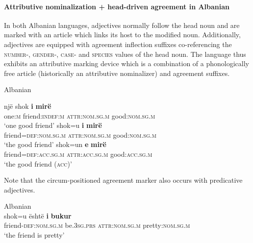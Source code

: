 \paragraph{Attributive nominalization + head-driven agreement in Albanian}
In both Albanian languages, adjectives normally follow the head noun and are marked with an article which links its host to the modified noun. Additionally, adjectives are equipped with agreement inflection suffixes co-referencing the \textsc{number}-, \textsc{gender}-, \textsc{case}- and \textsc{species} values of the head noun. The language thus exhibits an attributive marking device which is a combination of a phonologically free article (historically an attributive nominalizer) and agreement suffixes.
\begin{exe}
\label{albanian ex}
\ex \rm{Albanian \citep[examples from][166–167]{himmelmann1997}}
\begin{xlist}
\ex
\gll	nj\"e	shok 	\textbf{i}	\textbf{mir\"e}\\
	one:\textsc{m}	friend:\textsc{indef:m} 	\textsc{attr:nom.sg.m}	good:\textsc{nom.sg.m}\\
\glt	‘one good friend’
\ex	
\gll	shok=u			\textbf{i}			\textbf{mir\"e}\\
	friend=\textsc{def:nom.sg.m} 	\textsc{attr:nom.sg.m} 	good:\textsc{nom.sg.m}\\
\glt	‘the good friend’
\ex
\gll	shok=un					\textbf{e}			\textbf{mir\"e}\\
	friend=\textsc{def:acc.sg.m} 	\textsc{attr:acc.sg.m} 	good:\textsc{acc.sg.m}\\
\glt	‘the good friend (\textsc{acc})’
\end{xlist}
\end{exe}
Note that the circum-positioned agreement marker also occurs with predicative adjectives. 
\begin{exe}
\ex \rm{Albanian \citep{demiraj1998}}\\
\gll	shok=u \"esht\"e \textbf{i} \textbf{bukur}\\
	friend-\textsc{def:nom.sg.m} be\textsc{.3sg.prs} \textsc{attr:nom.sg.m} pretty:\textsc{nom.sg.m}\\
\glt	‘the friend is pretty’
\end{exe}
